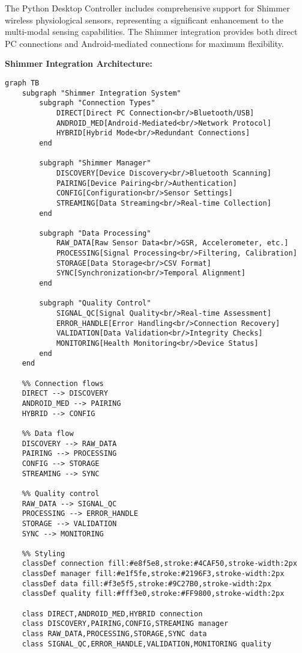\documentclass[12pt,a4paper]{article}
\begin{document}
The Python Desktop Controller includes comprehensive support for Shimmer wireless physiological sensors, representing a
significant enhancement to the multi-modal sensing capabilities. The Shimmer integration provides both direct PC
connections and Android-mediated connections for maximum flexibility.

\textbf{Shimmer Integration Architecture:}

\begin{verbatim}
graph TB
    subgraph "Shimmer Integration System"
        subgraph "Connection Types"
            DIRECT[Direct PC Connection<br/>Bluetooth/USB]
            ANDROID_MED[Android-Mediated<br/>Network Protocol]
            HYBRID[Hybrid Mode<br/>Redundant Connections]
        end
        
        subgraph "Shimmer Manager"
            DISCOVERY[Device Discovery<br/>Bluetooth Scanning]
            PAIRING[Device Pairing<br/>Authentication]
            CONFIG[Configuration<br/>Sensor Settings]
            STREAMING[Data Streaming<br/>Real-time Collection]
        end
        
        subgraph "Data Processing"
            RAW_DATA[Raw Sensor Data<br/>GSR, Accelerometer, etc.]
            PROCESSING[Signal Processing<br/>Filtering, Calibration]
            STORAGE[Data Storage<br/>CSV Format]
            SYNC[Synchronization<br/>Temporal Alignment]
        end
        
        subgraph "Quality Control"
            SIGNAL_QC[Signal Quality<br/>Real-time Assessment]
            ERROR_HANDLE[Error Handling<br/>Connection Recovery]
            VALIDATION[Data Validation<br/>Integrity Checks]
            MONITORING[Health Monitoring<br/>Device Status]
        end
    end
    
    %% Connection flows
    DIRECT --> DISCOVERY
    ANDROID_MED --> PAIRING
    HYBRID --> CONFIG
    
    %% Data flow
    DISCOVERY --> RAW_DATA
    PAIRING --> PROCESSING
    CONFIG --> STORAGE
    STREAMING --> SYNC
    
    %% Quality control
    RAW_DATA --> SIGNAL_QC
    PROCESSING --> ERROR_HANDLE
    STORAGE --> VALIDATION
    SYNC --> MONITORING
    
    %% Styling
    classDef connection fill:#e8f5e8,stroke:#4CAF50,stroke-width:2px
    classDef manager fill:#e1f5fe,stroke:#2196F3,stroke-width:2px
    classDef data fill:#f3e5f5,stroke:#9C27B0,stroke-width:2px
    classDef quality fill:#fff3e0,stroke:#FF9800,stroke-width:2px
    
    class DIRECT,ANDROID_MED,HYBRID connection
    class DISCOVERY,PAIRING,CONFIG,STREAMING manager
    class RAW_DATA,PROCESSING,STORAGE,SYNC data
    class SIGNAL_QC,ERROR_HANDLE,VALIDATION,MONITORING quality
\end{verbatim}
\end{document}
